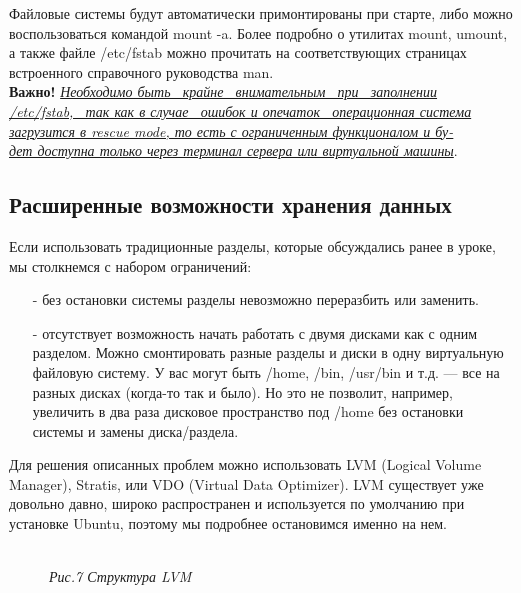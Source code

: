 \documentclass[14pt, a4paper]{article}
\begin{document}
Файловые системы будут автоматически примонтированы при старте, либо можно воспользоваться
командой \colorbox{backcolour}{mount -a}. Более подробно о утилитах mount, umount, а также файле /etc/fstab можно
прочитать на соответствующих страницах встроенного справочного руководства man.\\

\textbf{Важно!} \underline{\textit{Необходимо  быть \ крайне \ внимательным \ при \ заполнении}}\\ 
\underline{\textit{/etc/fstab, \ так как в случае \ ошибок и опечаток \ операционная система}} \\
\underline{\textit{загрузится в rescue mode, то есть с ограниченным функционалом и бу-}} \\
\underline{\textit{дет доступна только через терминал сервера или виртуальной машины}}.

\newpage

\subsection*{Расширенные возможности хранения данных} 

Если использовать традиционные разделы, которые обсуждались ранее в уроке, мы столкнемся с
набором ограничений:

\begin{itemize}
    \item[-] без остановки системы разделы невозможно переразбить или заменить.
    \item[-] отсутствует возможность начать работать с двумя дисками как с одним разделом.
    Можно смонтировать разные разделы и диски в одну виртуальную файловую систему. У вас
    могут быть /home, /bin, /usr/bin и т.д. — все на разных дисках (когда-то так и было). Но это не
    позволит, например, увеличить в два раза дисковое пространство под /home без остановки
    системы и замены диска/раздела.
\end{itemize}

\noindent Для решения описанных проблем можно использовать LVM (Logical Volume Manager), Stratis, или VDO
(Virtual Data Optimizer). LVM существует уже довольно давно, широко распространен и используется
по умолчанию при установке Ubuntu, поэтому мы подробнее остановимся именно на нем.

\begin{figure}[h]
    \centering
    \\ 
    \small\textit{Рис.7 Структура LVM}  
    \label{framework} 
\end{figure}
\end{document}
